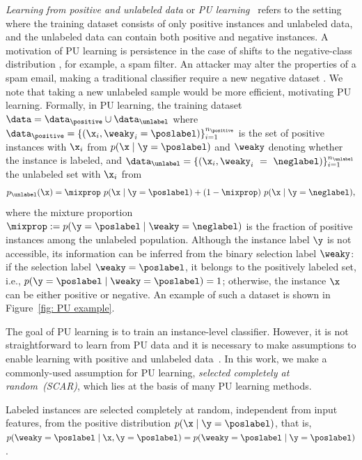 \documentclass{article}
\begin{document}
\emph{Learning from positive and unlabeled data} or \emph{PU learning}~\citep{PUoriginal, PUoriginal2}
refers to the setting where the training dataset consists of only positive instances and unlabeled data, and the unlabeled data can contain both positive and negative instances. 
A motivation of PU learning is persistence in the case of shifts to the negative-class distribution \citep{pmlr-v37-plessis15}, for example, a spam filter.
An attacker may alter the properties of a spam email, making a traditional classifier require a new negative dataset \citep{pmlr-v37-plessis15}. We note that taking a new unlabeled sample would be more efficient, motivating PU learning. 
Formally, in PU learning,
the training dataset $\data = \data_{\positive} \cup \data_{\unlabel}$
where $\data_{\positive} = \{(\x_i, \weaky_i = \poslabel)\}_{i = 1}^{n_{\positive}}$ is the set of positive instances 
with $\x_i$ from $p(\x \mid \y = \poslabel)$ and $\weaky$ denoting whether the instance is labeled,
and $\data_{\unlabel} = \{(\x_i, \weaky_i~=~\neglabel)\}_{i = 1}^{n_{\unlabel}}$ the unlabeled set
with $\x_i$ from 
\begin{equation}
\label{eq: mixture}
    p_{\unlabel}(\x) = \mixprop~p(\x \mid \y = \poslabel) + (1 - \mixprop)~p(\x \mid \y = \neglabel),
\end{equation}
where the mixture proportion $\mixprop := p(\y = \poslabel \mid \weaky = \neglabel)$ is the fraction of positive instances among the unlabeled population.
Although the instance label $\y$ is not accessible, its information can be inferred from the binary selection label $\weaky$:
if the selection label $\weaky = \poslabel$, it belongs to the positively labeled set, i.e., $p(\y = \poslabel \mid \weaky = \poslabel) = 1$;
otherwise,
the instance $\x$ can be either positive or negative. An example of such a dataset is shown in Figure~\ref{fig: PU example}.

The goal of PU learning is to train an instance-level classifier.
However, it is not straightforward to learn from PU data and it is necessary to make assumptions to enable learning with positive and unlabeled data~\citep{bekker2020learning}.
In this work, we make 
a commonly-used assumption for PU learning, \emph{selected completely at random~(SCAR)}, which lies at the basis of many PU learning methods.

\begin{definition}
\label{def: scar}
Labeled instances are selected completely at random, independent from input features, from the positive distribution $p(\x \mid \y = \poslabel)$,
that is, $p(\weaky = \poslabel \mid \x, \y = \poslabel) = p(\weaky = \poslabel \mid \y = \poslabel)$.
\end{definition}
\end{document}
